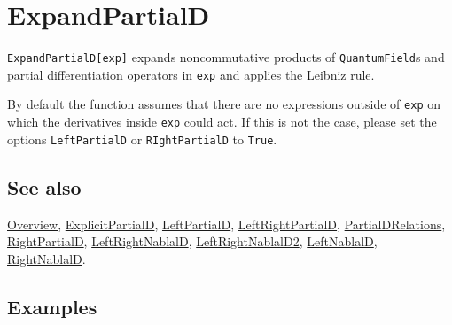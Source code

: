 \documentclass[../FeynCalcManual.tex]{subfiles}
\begin{document}
\hypertarget{expandpartiald}{
\section{ExpandPartialD}\label{expandpartiald}}

\texttt{ExpandPartialD[\allowbreak{}exp]} expands noncommutative
products of \texttt{QuantumField}s and partial differentiation operators
in \texttt{exp} and applies the Leibniz rule.

By default the function assumes that there are no expressions outside of
\texttt{exp} on which the derivatives inside \texttt{exp} could act. If
this is not the case, please set the options \texttt{LeftPartialD} or
\texttt{RIghtPartialD} to \texttt{True}.

\subsection{See also}

\hyperlink{toc}{Overview},
\hyperlink{explicitpartiald}{ExplicitPartialD},
\hyperlink{leftpartiald}{LeftPartialD},
\hyperlink{leftrightpartiald}{LeftRightPartialD},
\hyperlink{partialdrelations}{PartialDRelations},
\hyperlink{rightpartiald}{RightPartialD},
\hyperlink{leftrightnablald}{LeftRightNablalD},
\hyperlink{leftrightnablald2}{LeftRightNablalD2},
\hyperlink{leftnablald}{LeftNablalD},
\hyperlink{rightnablald}{RightNablalD}.

\subsection{Examples}

\begin{Shaded}
\begin{Highlighting}[]
\OperatorTok{[}\SpecialCharTok{\textbackslash{}}\OperatorTok{[}\OperatorTok{]]}\OperatorTok{[}\OperatorTok{,}\OperatorTok{[}\SpecialCharTok{\textbackslash{}}\OperatorTok{[}\OperatorTok{]]]}\OperatorTok{[}\OperatorTok{,}\OperatorTok{[}\SpecialCharTok{\textbackslash{}}\OperatorTok{[}\OperatorTok{]]]} 
 
\OperatorTok{[}\SpecialCharTok{\%}\OperatorTok{]}
\end{Highlighting}
\end{Shaded}
\end{document}

